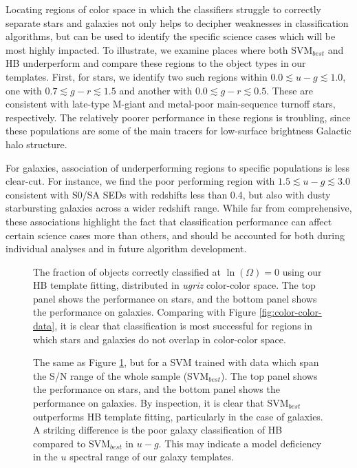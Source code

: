\documentclass[12pt,preprint]{aastex}
\begin{document}
Locating regions of color space in which the classifiers struggle to
correctly separate stars and galaxies not only helps to decipher
weaknesses in classification algorithms, but can be used to identify
the specific science cases which will be most highly impacted.  To
illustrate, we examine places where both SVM$_{best}$ and HB
underperform and compare these regions to the object types in our
templates.  First, for stars, we identify two such regions within
$0.0\lesssim u-g \lesssim 1.0$, one with $0.7\lesssim g-r \lesssim
1.5$ and another with $0.0\lesssim g-r \lesssim 0.5$.  These are
consistent with late-type M-giant and metal-poor main-sequence turnoff
stars, respectively.  The relatively poorer performance in these
regions is troubling, since these populations are some of the main
tracers for low-surface brightness Galactic halo structure.  

For galaxies, association of underperforming regions to specific
populations is less clear-cut.  For instance, we find the poor
performing region with $1.5\lesssim u-g \lesssim 3.0$ consistent with
S0/SA SEDs with redshifts less than 0.4, but also with dusty
starbursting galaxies across a wider redshift range.  While far from
comprehensive, these associations highlight the fact that
classification performance can affect certain science cases more than
others, and should be accounted for both during individual analyses
and in future algorithm development.


\begin{figure}
\centering
\caption{The fraction of objects correctly classified at
  $\ln(\Omega)=0$ using our HB template fitting, distributed in {\it
    ugriz} color-color space.  The top panel shows the performance on stars, and the bottom panel shows the performance on galaxies.  Comparing with Figure
  \ref{fig:color-color-data}, it is clear that classification is most
  successful for regions in which stars and galaxies do not overlap in
  color-color space.}
\label{fig:color-color-hb-fraction}
\end{figure}

\begin{figure}
\centering
\caption{The same as Figure \ref{fig:color-color-hb-fraction}, but for
  a SVM trained with data which span the S/N range of the whole sample
  (SVM$_{best}$).  The top panel shows the performance on stars, and
  the bottom panel shows the performance on galaxies.  By inspection,
  it is clear that SVM$_{best}$ outperforms HB template fitting,
  particularly in the case of galaxies.  A striking difference is the
  poor galaxy classification of HB compared to SVM$_{best}$ in $u-g$.
  This may indicate a model deficiency in the $u$ spectral range of
  our galaxy templates.}
\label{fig:color-color-svm-fraction}
\end{figure}
\end{document}
